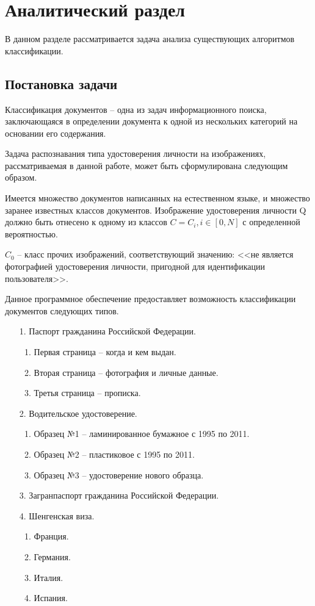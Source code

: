\chapter{\textbf{Аналитический раздел}}

В данном разделе рассматривается задача анализа существующих алгоритмов классификации.

\section{Постановка задачи}

Классификация документов -- одна из задач информационного поиска, заключающаяся в определении документа к одной из нескольких категорий на основании его содержания. 

Задача распознавания типа удостоверения личности на изображениях, рассматриваемая в данной работе, может быть сформулирована следующим образом. 

Имеется множество документов написанных на естественном языке, и множество заранее известных классов документов. Изображение удостоверения личности Q должно быть отнесено к одному из классов $C=C_i, i \in [0, N]$ с определенной вероятностью.

$C_0$ -- класс прочих изображений, соответствующий значению: <<не является фотографией удостоверения личности, пригодной для идентификации пользователя>>.

Данное программное обеспечение предоставляет возможность классификации документов следующих типов. 
\begin{enumerate}
\item[1.] Паспорт гражданина Российской Федерации.
\begin{enumerate}
\item Первая страница -- когда и кем выдан.
\item Вторая страница -- фотография и личные данные.
\item Третья страница -- прописка.
\end{enumerate}
\item[2.] Водительское удостоверение.
\begin{enumerate}
\item Образец №1 -- ламинированное бумажное с 1995 по 2011.
\item Образец №2 -- пластиковое с 1995 по 2011.
\item Образец №3 -- удостоверение нового образца.
\end{enumerate}
\item[3.] Загранпаспорт гражданина Российской Федерации.
\item[4.] Шенгенская виза.
\begin{enumerate}
\item Франция.
\item Германия.
\item Италия.
\item Испания.
\end{enumerate}
\end{enumerate}

